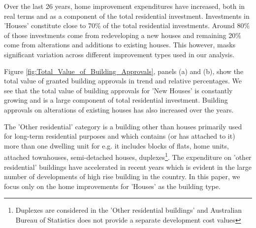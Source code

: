 \documentclass{article}
\begin{document}
Over the last 26 years, home improvement expenditures have increased, both in real terms and as a component of the total residential investment. Investments in 'Houses' constitute close to 70\% of the total residential investments. Around 80\% of those investments come from redeveloping a new houses and remaining 20\% come from alterations and additions to existing houses. \citep{abs1} This however, masks significant variation across different improvement types used in our analysis.

Figure \ref{fig:Total_Value_of_Building_Approvals}, panels (a) and (b), show the total value of granted building approvals in trend and relative percentages. We see that the total value of building approvals for 'New Houses' is constantly growing and is a large component of total residential investment. Building approvals on alterations of existing houses has also increased over the years.

The 'Other residential' category is a building other than houses primarily used for long-term residential purposes and which contains (or has attached to it) more than one dwelling unit for e.g. it includes blocks of flats, home units, attached townhouses, semi-detached houses, duplexes\footnote{Duplexes are considered in the 'Other residential buildings' and Australian Bureau of Statistics does not provide a separate development cost values}. The expenditure on 'other residential' buildings have accelerated in recent years which is evident in the large number of developments of high rise building in the country. In this paper, we focus only on the home improvements for 'Houses' as the building type. 
\end{document}

